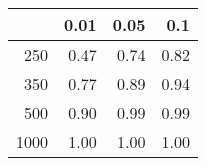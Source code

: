 % 
\begin{tabular}{rrrr}
  \hline
 & 0.01 & 0.05 & 0.1 \\ 
  \hline
250 & 0.47 & 0.74 & 0.82 \\ 
  350 & 0.77 & 0.89 & 0.94 \\ 
  500 & 0.90 & 0.99 & 0.99 \\ 
  1000 & 1.00 & 1.00 & 1.00 \\ 
   \hline
\end{tabular}
